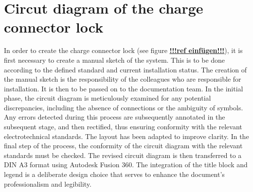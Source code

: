 
\addtocounter{page}{1}

\section{Circut diagram of the charge connector lock }

In order to create the charge connector lock (see figure \textbf{\underline{!!!ref einfügen!!!}}), it is first necessary to create a manual sketch of the system. This is to be done according to the defined standard and current installation status. The creation of the manual sketch is the responsibility of the colleagues who are responsible for installation. It is then to be passed on to the documentation team. In the initial phase, the circuit diagram is meticulously examined for any potential discrepancies, including the absence of connections or the ambiguity of symbols. Any errors detected during this process are subsequently annotated in the subsequent stage, and then rectified, thus ensuring conformity with the relevant electrotechnical standards. The layout has been adapted to improve clarity. In the final step of the process, the conformity of the circuit diagram with the relevant standards must be checked. The revised circuit diagram is then transferred to a DIN A3 format using Autodesk Fusion 360. The integration of the title block and legend is a deliberate design choice that serves to enhance the document's professionalism and legibility.

